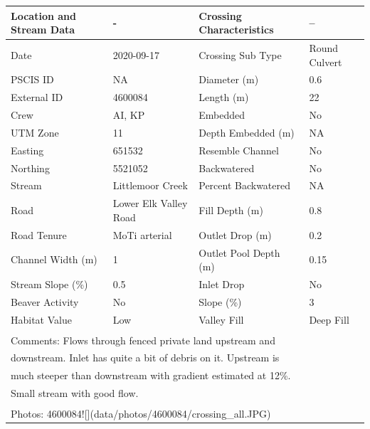 \documentclass[
]{book}
\begin{document}
\begin{tabular}{llll}
\toprule
Location and Stream Data & - & Crossing Characteristics & --\\
\midrule
Date & 2020-09-17 & Crossing Sub Type & Round Culvert\\
PSCIS ID & NA & Diameter (m) & 0.6\\
External ID & 4600084 & Length (m) & 22\\
Crew & AI, KP & Embedded & No\\
UTM Zone & 11 & Depth Embedded (m) & NA\\
\addlinespace
Easting & 651532 & Resemble Channel & No\\
Northing & 5521052 & Backwatered & No\\
Stream & Littlemoor Creek & Percent Backwatered & NA\\
Road & Lower Elk Valley Road & Fill Depth (m) & 0.8\\
Road Tenure & MoTi arterial & Outlet Drop (m) & 0.2\\
\addlinespace
Channel Width (m) & 1 & Outlet Pool Depth (m) & 0.15\\
Stream Slope (\%) & 0.5 & Inlet Drop & No\\
Beaver Activity & No & Slope (\%) & 3\\
Habitat Value & Low & Valley Fill & Deep Fill\\
\bottomrule
\multicolumn{4}{l}{\textsuperscript{} Comments: Flows through fenced private land upstream and}\\
\multicolumn{4}{l}{downstream. Inlet has quite a bit of debris on it. Upstream is}\\
\multicolumn{4}{l}{much steeper than downstream with gradient estimated at 12\%.}\\
\multicolumn{4}{l}{Small stream with good flow.}\\
\multicolumn{4}{l}{\textsuperscript{} Photos: 4600084![](data/photos/4600084/crossing\_all.JPG)}\\
\end{tabular}
\end{document}
